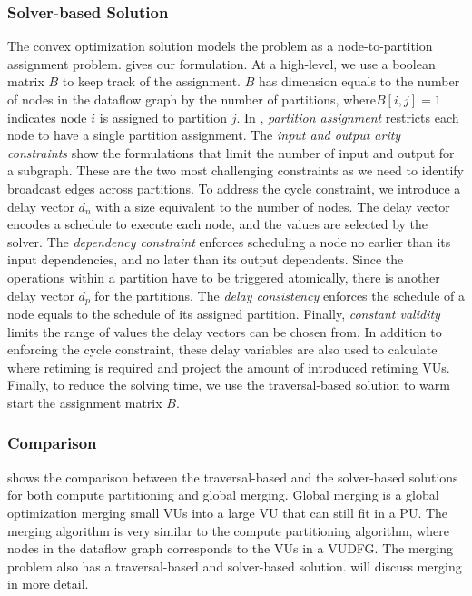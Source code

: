 \subsubsection{Solver-based Solution}
The convex optimization solution models the problem as a node-to-partition assignment problem.
 gives our formulation.
At a high-level, we use a boolean matrix $B$ to keep track of the assignment. 
$B$ has dimension equals to the number of nodes in the dataflow graph by the number of partitions, where$B[i,j]=1$ 
indicates node $i$ is assigned to partition $j$.
In , \emph{partition assignment} restricts each node to have a single partition assignment.
The \emph{input and output arity constraints} show the formulations that limit the number of input
and output for a subgraph.
These are the two most challenging constraints as we need to identify broadcast edges across partitions.
To address the cycle constraint, we introduce a delay vector $d_n$ with a size equivalent to the number of nodes. 
The delay vector encodes a schedule to execute each node, and the values are selected by the solver.
The \emph{dependency constraint} enforces scheduling a node no earlier than its input dependencies, and
no later than its output dependents.
Since the operations within a partition have to be triggered atomically, there is another delay
vector $d_p$ for the partitions. The \emph{delay consistency} enforces the schedule of a node equals to the
schedule of its assigned partition.
Finally, \emph{constant validity} limits the range of values the delay vectors can be chosen from.
In addition to enforcing the cycle constraint, 
these delay variables are also used to calculate where retiming is required and project the amount of introduced retiming VUs. 
Finally, to reduce the solving time, we use the traversal-based solution to warm start the assignment matrix
$B$.



\subsubsection{Comparison}
 shows the comparison between the traversal-based and the solver-based solutions for both
compute partitioning and global merging.
Global merging is a global optimization merging small VUs into a large VU that can still fit in
a PU. 
The merging algorithm is very similar to the compute partitioning algorithm, where nodes in the
dataflow graph corresponds to the VUs in a VUDFG. 
The merging problem also has a traversal-based and solver-based solution.
 will discuss merging in more detail.

